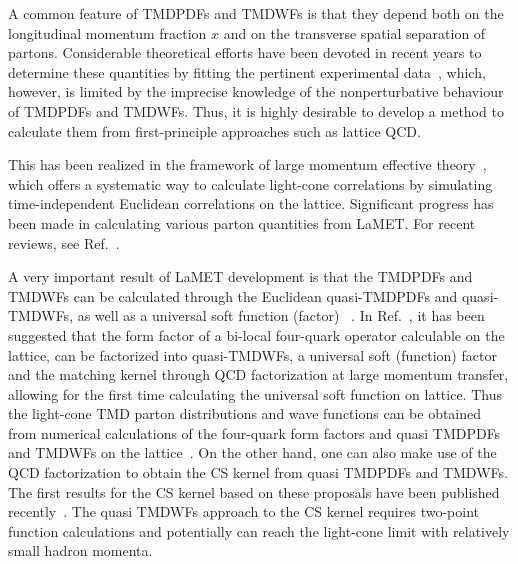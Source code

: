 \documentclass[prd,aps,twocolumn,preprintnumbers, showpacs, nofootinbib,superscriptaddress,notitlepage]{revtex4-1}
\begin{document}
A common feature of TMDPDFs and TMDWFs is that they depend both on the longitudinal momentum fraction $x$ and on the transverse spatial separation of partons.  Considerable theoretical efforts have been devoted in recent years to determine these quantities by fitting the pertinent experimental data~\cite{Landry:1999an,Landry:2002ix,DAlesio:2014mrz,Sun:2014dqm,Konychev:2005iy,Bacchetta:2017gcc,Scimemi:2017etj,Scimemi:2019cmh,Bacchetta:2019sam}, which, however, %
is limited by the imprecise knowledge of the nonperturbative behaviour of TMDPDFs and TMDWFs. Thus, it is highly desirable to develop a method to calculate them from first-principle approaches such as lattice QCD.

This has been realized in the framework of large momentum effective theory~\cite{Ji:2013dva,Ji:2014gla}, which offers a systematic way to calculate light-cone correlations by simulating time-independent Euclidean correlations on the lattice. Significant progress has been made in calculating various parton quantities from LaMET. For recent reviews, see Ref.~\cite{Cichy:2018mum,Ji:2020ect}. 

A very important result of LaMET development is that the TMDPDFs and TMDWFs can be calculated through the Euclidean quasi-TMDPDFs and quasi-TMDWFs, as well as a universal soft function (factor) ~\cite{Ebert:2019okf,Ji:2019sxk,Ji:2019ewn,Ji:2021znw}. In Ref.~\cite{Ji:2019sxk}, it has been suggested that the form factor of a bi-local four-quark operator calculable on the lattice, can be factorized into quasi-TMDWFs, a universal soft (function) factor and the matching kernel through QCD factorization at large momentum transfer, allowing
for the first time calculating the universal soft function on lattice. Thus the light-cone TMD parton distributions and wave functions can be obtained from numerical calculations of the four-quark form factors and quasi TMDPDFs and TMDWFs on the lattice~\cite{Ji:2019sxk,Ji:2019ewn}.  On the other hand, one can also make use of the QCD factorization to obtain the CS kernel from quasi TMDPDFs and TMDWFs. The first results for the CS kernel based on these proposals have been published recently~\cite{Shanahan:2020zxr,LatticeParton:2020uhz,Schlemmer:2021aij,Li:2021wvl,Shanahan:2021tst}. The quasi TMDWFs approach
to the CS kernel requires two-point function calculations 
and potentially can reach the light-cone limit with relatively
small hadron momenta. 
\end{document}
